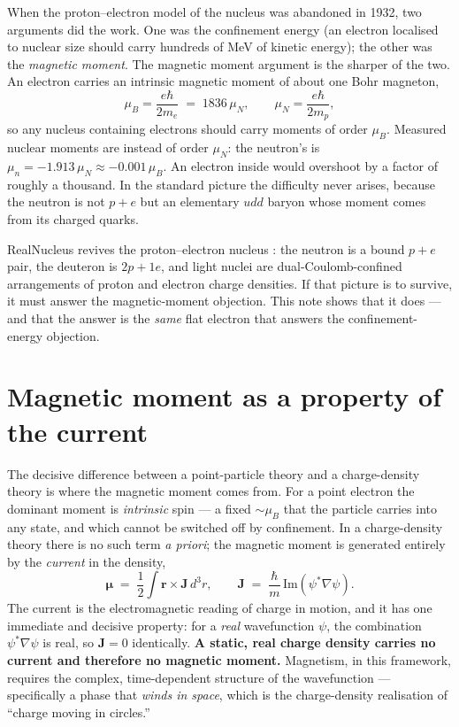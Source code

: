 \documentclass[11pt]{article}
\begin{document}
When the proton--electron model of the nucleus was abandoned in 1932, two arguments did the work. One
was the confinement energy (an electron localised to nuclear size should carry hundreds of MeV of kinetic
energy); the other was the \emph{magnetic moment}. The magnetic moment argument is the sharper of the
two. An electron carries an intrinsic magnetic moment of about one Bohr magneton,
\begin{equation}
\mu_B = \frac{e\hbar}{2m_e} \;=\; 1836\,\mu_N, \qquad \mu_N = \frac{e\hbar}{2m_p},
\end{equation}
so any nucleus containing electrons should carry moments of order $\mu_B$. Measured nuclear moments are
instead of order $\mu_N$: the neutron's is $\mu_n = -1.913\,\mu_N \approx -0.001\,\mu_B$. An electron
inside would overshoot by a factor of roughly a thousand. In the standard picture the difficulty never
arises, because the neutron is not $p+e$ but an elementary $udd$ baryon whose moment comes from its
charged quarks.

RealNucleus revives the proton--electron nucleus \cite{RealNucleus}: the neutron is a bound $p+e$ pair,
the deuteron is $2p+1e$, and light nuclei are dual-Coulomb-confined arrangements of proton and electron
charge densities. If that picture is to survive, it must answer the magnetic-moment objection. This note
shows that it does --- and that the answer is the \emph{same} flat electron that answers the
confinement-energy objection.

\section{Magnetic moment as a property of the current}
\label{sec:current}

The decisive difference between a point-particle theory and a charge-density theory is where the magnetic
moment comes from. For a point electron the dominant moment is \emph{intrinsic} spin --- a fixed
$\sim\mu_B$ that the particle carries into any state, and which cannot be switched off by confinement.
In a charge-density theory there is no such term \emph{a priori}; the magnetic moment is generated
entirely by the \emph{current} in the density,
\begin{equation}
\boldsymbol\mu \;=\; \frac{1}{2}\!\int \mathbf r\times\mathbf J\,d^3r,
\qquad
\mathbf J \;=\; \frac{\hbar}{m}\,\mathrm{Im}\!\left(\psi^*\nabla\psi\right).
\label{eq:mu}
\end{equation}
The current is the electromagnetic reading of charge in motion, and it has one immediate and decisive
property: for a \emph{real} wavefunction $\psi$, the combination $\psi^*\nabla\psi$ is real, so
$\mathbf J = 0$ identically. \textbf{A static, real charge density carries no current and therefore no
magnetic moment.} Magnetism, in this framework, requires the complex, time-dependent structure of the
wavefunction --- specifically a phase that \emph{winds in space}, which is the charge-density realisation
of ``charge moving in circles.''
\end{document}
